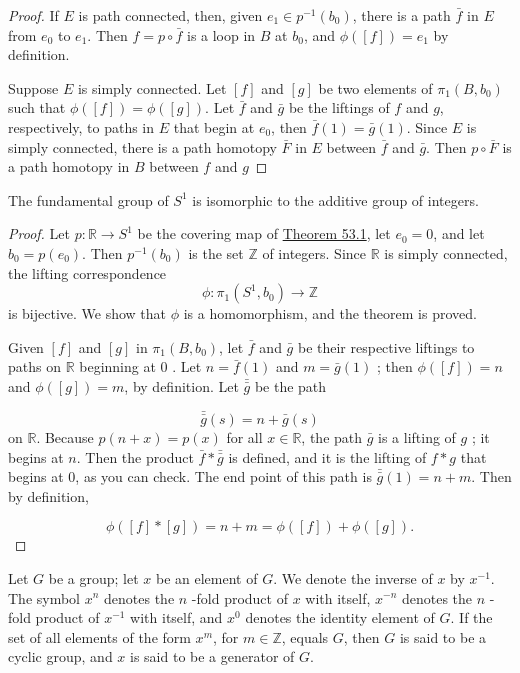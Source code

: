 \begin{proof}
If \(E\) is path connected, then, given \(e_{1} \in {p}^{-1}( b_{0})\), there is a path \(\bar{f}\) in \(E\) from \(e_{0}\) to \(e_{1}\). Then \(f = p \circ \bar{f}\) is a loop in \(B\) at \(b_{0}\), and \(\phi ( [ f] ) = e_{1}\) by definition.

Suppose \(E\) is simply connected. Let \([ f]\) and \([ g]\) be two elements of \({\pi }_{1}( {B,b_{0}})\) such that \(\phi ( [ f] ) = \phi ( [ g] )\). Let \(\bar{f}\) and \(\bar{g}\) be the liftings of \(f\) and \(g\), respectively, to paths in \(E\) that begin at \(e_{0}\), then \(\bar{f}(1) = \bar{g}(1)\). Since \(E\) is simply connected, there is a path homotopy \(\bar{F}\) in \(E\) between \(\bar{f}\) and \(\bar{g}\). Then \(p \circ \bar{F}\) is a path homotopy in \(B\) between \(f\) and \(g\)
\end{proof}
\begin{theorem}
\label{thm:\thetheorem}
The fundamental group of \(S^{1}\) is isomorphic to the additive group of integers.
\end{theorem}

\begin{proof}
Let \(p : \mathbb{R} \rightarrow {S}^{1}\) be the covering map of \hyperref[thm:53.1]{Theorem 53.1}, let \(e_{0} = 0\), and let \(b_{0} = p( e_{0})\). Then \(p^{-1}( b_{0})\) is the set \(\mathbb{Z}\) of integers. Since \(\mathbb{R}\) is simply connected, the lifting correspondence
\[
\phi : {\pi }_{1}( {S^{1},b_{0}}) \rightarrow \mathbb{Z}
\]
is bijective. We show that \(\phi\) is a homomorphism, and the theorem is proved.

Given \([ f]\) and \([ g]\) in \({\pi }_{1}( {B,b_{0}})\), let \(\bar{f}\) and \(\bar{g}\) be their respective liftings to paths on \(\mathbb{R}\) beginning at 0 . Let \(n = \bar{f}(1)\) and \(m = \bar{g}(1)\) ; then \(\phi ( [ f] ) = n\) and \(\phi ( [ g] ) = m\), by definition. Let \(\bar{\bar{g}}\) be the path

\[
\bar{\bar{g}}( s) = n + \bar{g}( s)
\]
on \(\mathbb{R}\). Because \(p( {n + x}) = p(x)\) for all \(x \in \mathbb{R}\), the path \(\bar{g}\) is a lifting of \(g\) ; it begins at \(n\). Then the product \(\bar{f} * \bar{\bar{g}}\) is defined, and it is the lifting of \(f * g\) that begins at 0, as you can check. The end point of this path is \(\bar{\bar{g}}(1) = n + m\). Then by definition,

\[
\phi ( {[ f] * [ g] }) = n + m = \phi ( [ f] ) + \phi ( [ g] ).
\]
\end{proof}
\begin{definition}
Let \(G\) be a group; let \(x\) be an element of \(G\). We denote the inverse of \(x\) by \(x^{-1}\). The symbol \(x^{n}\) denotes the \(n\) -fold product of \(x\) with itself, \(x^{-n}\) denotes the \(n\) -fold product of \(x^{-1}\) with itself, and \(x^{0}\) denotes the identity element of \(G\). If the set of all elements of the form \(x^{m}\), for \(m \in \mathbb{Z}\), equals \(G\), then \(G\) is said to be a cyclic group, and \(x\) is said to be a generator of \(G\).
\end{definition}

